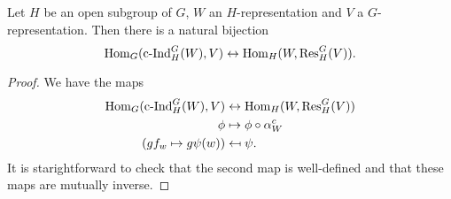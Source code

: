 \documentclass{memoir}
\begin{document}
\begin{thm}
    Let $H$ be an open subgroup of $G$, $W$ an $H$-representation and $V$ a $G$-representation.
    Then there is a natural bijection 
    \begin{equation}
        \operatorname{Hom}_G(\text{c-Ind}_H^G(W),V) \leftrightarrow \operatorname{Hom}_H(W,\text{Res}_H^G(V)).
    \end{equation}
\end{thm}
\begin{proof}
    We have the maps
    \begin{align}
        \operatorname{Hom}_G(\text{c-Ind}_H^G(W),V) &\leftrightarrow \operatorname{Hom}_H(W,\text{Res}_H^G(V)) \\
        \phi &\mapsto \phi\circ \alpha_W^c \\
        (gf_w \mapsto g\psi(w)) &\mapsfrom \psi.
    \end{align}
    It is starightforward to check that the second map is well-defined and that these maps are mutually inverse.
\end{proof}
\end{document}
